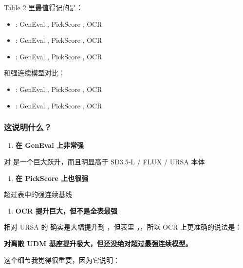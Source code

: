 Table 2 里最值得记的是：

\begin{itemize}[leftmargin=1.5em]
  \item {}: GenEval , PickScore , OCR 
  \item {}: GenEval , PickScore , OCR 
  \item {}: GenEval , PickScore , OCR 
\end{itemize}

和强连续模型对比：

\begin{itemize}[leftmargin=1.5em]
  \item {}: GenEval , PickScore , OCR 
  \item {}: GenEval , PickScore , OCR 
\end{itemize}

\subsubsection{这说明什么？}

\begin{enumerate}[leftmargin=1.5em]
  \item \textbf{在 GenEval 上非常强}
\end{enumerate}

 对  是一个巨大跃升，而且明显高于 SD3.5-L / FLUX / URSA 本体

\begin{enumerate}[leftmargin=1.5em]
  \item \textbf{在 PickScore 上也很强}
\end{enumerate}

 超过表中的强连续基线 

\begin{enumerate}[leftmargin=1.5em]
  \item \textbf{OCR 提升巨大，但不是全表最强}
\end{enumerate}

相对 URSA 的  确实是大幅提升到 ，但表里 ，，所以 OCR 上更准确的说法是：

\textbf{对离散 UDM 基座提升极大，但还没绝对超过最强连续模型。}

这个细节我觉得很重要，因为它说明：

